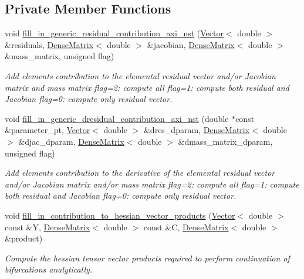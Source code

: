 \subsection*{Private Member Functions}
\begin{DoxyCompactItemize}
\item 
void \hyperlink{classoomph_1_1RefineableGeneralisedNewtonianAxisymmetricNavierStokesEquations_a2db17023f544958a02c0c787da9020df}{fill\+\_\+in\+\_\+generic\+\_\+residual\+\_\+contribution\+\_\+axi\+\_\+nst} (\hyperlink{classoomph_1_1Vector}{Vector}$<$ double $>$ \&residuals, \hyperlink{classoomph_1_1DenseMatrix}{Dense\+Matrix}$<$ double $>$ \&jacobian, \hyperlink{classoomph_1_1DenseMatrix}{Dense\+Matrix}$<$ double $>$ \&mass\+\_\+matrix, unsigned flag)
\begin{DoxyCompactList}\small\item\em Add element\textquotesingle{}s contribution to the elemental residual vector and/or Jacobian matrix and mass matrix flag=2\+: compute all flag=1\+: compute both residual and Jacobian flag=0\+: compute only residual vector. \end{DoxyCompactList}\item 
void \hyperlink{classoomph_1_1RefineableGeneralisedNewtonianAxisymmetricNavierStokesEquations_a5c48a485d233b8932b58a46138d34241}{fill\+\_\+in\+\_\+generic\+\_\+dresidual\+\_\+contribution\+\_\+axi\+\_\+nst} (double $\ast$const \&parameter\+\_\+pt, \hyperlink{classoomph_1_1Vector}{Vector}$<$ double $>$ \&dres\+\_\+dparam, \hyperlink{classoomph_1_1DenseMatrix}{Dense\+Matrix}$<$ double $>$ \&djac\+\_\+dparam, \hyperlink{classoomph_1_1DenseMatrix}{Dense\+Matrix}$<$ double $>$ \&dmass\+\_\+matrix\+\_\+dparam, unsigned flag)
\begin{DoxyCompactList}\small\item\em Add element\textquotesingle{}s contribution to the derivative of the elemental residual vector and/or Jacobian matrix and/or mass matrix flag=2\+: compute all flag=1\+: compute both residual and Jacobian flag=0\+: compute only residual vector. \end{DoxyCompactList}\item 
void \hyperlink{classoomph_1_1RefineableGeneralisedNewtonianAxisymmetricNavierStokesEquations_a7794ad4a3ea19be7604d7c8884debe70}{fill\+\_\+in\+\_\+contribution\+\_\+to\+\_\+hessian\+\_\+vector\+\_\+products} (\hyperlink{classoomph_1_1Vector}{Vector}$<$ double $>$ const \&Y, \hyperlink{classoomph_1_1DenseMatrix}{Dense\+Matrix}$<$ double $>$ const \&C, \hyperlink{classoomph_1_1DenseMatrix}{Dense\+Matrix}$<$ double $>$ \&product)
\begin{DoxyCompactList}\small\item\em Compute the hessian tensor vector products required to perform continuation of bifurcations analytically. \end{DoxyCompactList}\end{DoxyCompactItemize}
